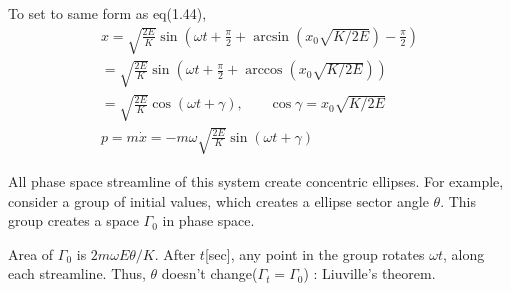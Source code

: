 \documentclass{jarticle}
\begin{document}
To set to same form as eq(1.44), 
\begin{eqnarray}
	x = \sqrt{\frac{2E}{K}}\sin\left(\omega t + \frac{\pi}{2} + \arcsin(x_0\sqrt{K/2E}) - \frac{\pi}{2}\right) \nonumber \\
	= \sqrt{\frac{2E}{K}}\sin\left(\omega t + \frac{\pi}{2} + \arccos(x_0\sqrt{K/2E})\right) \nonumber \\
	= \sqrt{\frac{2E}{K}}\cos(\omega t + \gamma), ~~~~~~~~ \cos\gamma = x_0\sqrt{K/2E} \nonumber \\
	p = m\dot{x} = -m\omega \sqrt{\frac{2E}{K}}\sin(\omega t + \gamma)
\end{eqnarray}

All phase space streamline of this system create concentric ellipses. For example, consider a group of initial values, which creates a ellipse sector angle $\theta$. This group creates a space $\Gamma_0$ in phase space. 

Area of $\Gamma_0$ is $2m\omega E\theta /K$. After $t$[sec], any point in the group rotates $\omega t$, along each streamline. Thus, $\theta$ doesn't change($\Gamma_t = \Gamma_0$) : Liuville's theorem.
\end{document}

